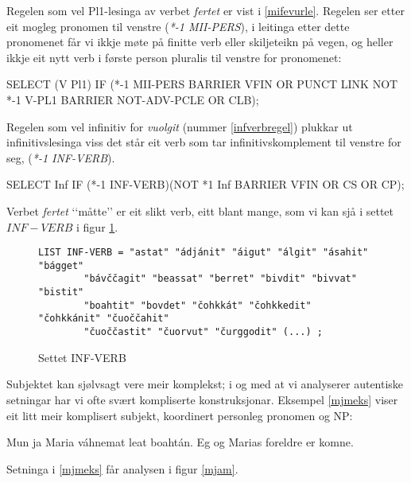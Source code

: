 \documentclass[a4paper,norsk]{article}
\begin{document}
Regelen som vel Pl1-lesinga av verbet \textit{fertet} er vist i \ref{mifevurle}. Regelen ser etter eit mogleg pronomen til venstre (\textit{*-1 MII-PERS}), i leitinga etter dette pronomenet får vi ikkje møte på finitte verb eller skiljeteikn på vegen, og heller ikkje eit nytt verb i første person pluralis til venstre for pronomenet:%

\begin{example}\label{mifevurle}
SELECT (V Pl1) IF (*-1 MII-PERS BARRIER VFIN OR PUNCT LINK NOT *-1 V-PL1 
	BARRIER NOT-ADV-PCLE OR CLB);
\end{example}	

Regelen som vel infinitiv for \textit{vuolgit} (nummer \ref{infverbregel}) plukkar ut infinitivslesinga viss det står eit verb som tar infinitivskomplement til venstre for seg, (\textit{*-1 INF-VERB}). %

\begin{example}\label{infverbregel}
SELECT Inf IF (*-1 INF-VERB)(NOT *1 Inf BARRIER VFIN OR CS OR CP);
\end{example}

Verbet \textit{fertet} ‘‘måtte’’ er eit slikt verb, eitt blant mange, som vi kan sjå i settet $INF-VERB$ i figur \ref{infverbsett}. %


\begin{figure}[htbp]
\begin{center}
\begin{verbatim}
LIST INF-VERB = "astat" "ádjánit" "áigut" "álgit" "ásahit" "bágget" 
		"bávččagit" "beassat" "berret" "bivdit" "bivvat" "bistit" 
		"boahtit" "bovdet" "čohkkát" "čohkkedit" "čohkkánit" "čuoččahit" 
		"čuoččastit" "čuorvut" "čurggodit" (...) ;
\end{verbatim}
\caption{Settet INF-VERB}
\label{infverbsett}
\end{center}
\end{figure}

Subjektet kan sjølvsagt vere meir komplekst; i og med at vi analyserer autentiske setningar har vi ofte svært kompliserte konstruksjonar. Eksempel \ref{mjmeks} viser eit litt meir komplisert subjekt, koordinert personleg pronomen og NP: %

\begin{example}\label{mjmeks}
\gll Mun ja Maria váhnemat  leat boahtán.
     Eg  og Marias foreldre er   komne.
\gln     
\glend
\end{example}%


Setninga i \ref{mjmeks} får analysen i figur \ref{mjam}. %
\end{document}
